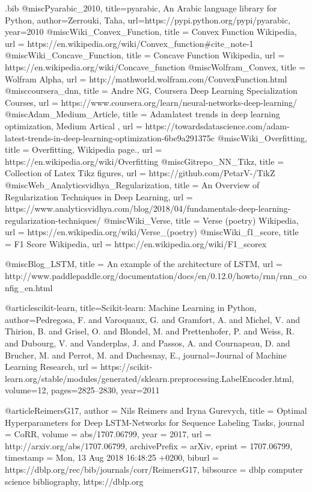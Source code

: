 \begin{filecontents}{\jobname.bib}
@misc{Pyarabic_2010,
  title={pyarabic, An Arabic language library for Python},
  author={Zerrouki, Taha},
  url={https://pypi.python.org/pypi/pyarabic},
  year={2010}
}
@misc{Wiki_Convex_Function,
  title =	 {Convex Function Wikipedia},
  url =		 {https://en.wikipedia.org/wiki/Convex\_function\#cite\_note-1}
}
@misc{Wiki_Concave_Function,
  title =	 {Concave Function Wikipedia},
  url =		 {https://en.wikipedia.org/wiki/Concave\_function}
}
@misc{Wolfram_Convex,
  title =	 {Wolfram Alpha},
  url =		 {http://mathworld.wolfram.com/ConvexFunction.html}
}
@misc{coursera_dnn,
  title =	 {Andre NG, Coursera Deep Learning Specialization Courses},
  url =		 {https://www.coursera.org/learn/neural-networks-deep-learning/}
}
@misc{Adam_Medium_Article,
  title =	 {Adam latest trends in deep learning optimization, Medium Artical },
  url =		 {https://towardsdatascience.com/adam-latest-trends-in-deep-learning-optimization-6be9a291375c}
}
@misc{Wiki_Overfitting,
  title =	 {Overfitting, Wikipedia page.},
  url =		 {https://en.wikipedia.org/wiki/Overfitting}
}
@misc{Gitrepo_NN_Tikz,
  title =	 {Collection of Latex Tikz figures},
  url =		 {https://github.com/PetarV-/TikZ}
}
@misc{Web_Analyticsvidhya_Regularization,
  title =	 {An Overview of Regularization Techniques in Deep Learning},
  url =		 {https://www.analyticsvidhya.com/blog/2018/04/fundamentals-deep-learning-regularization-techniques/}
}
@misc{Wiki_Verse,
  title =	 {Verse (poetry) Wikipedia},
  url =		 {https://en.wikipedia.org/wiki/Verse\_(poetry)}
}
@misc{Wiki_f1_score,
  title =	 {F1 Score Wikipedia},
  url =		 {https://en.wikipedia.org/wiki/F1\_scorex}
}

@misc{Blog_LSTM,
  title =	 {An example of the architecture of LSTM},
  url =		 {http://www.paddlepaddle.org/documentation/docs/en/0.12.0/howto/rnn/rnn_config_en.html}
}

@article{scikit-learn,
 title={Scikit-learn: Machine Learning in Python},
 author={Pedregosa, F. and Varoquaux, G. and Gramfort, A. and Michel, V.
         and Thirion, B. and Grisel, O. and Blondel, M. and Prettenhofer, P.
         and Weiss, R. and Dubourg, V. and Vanderplas, J. and Passos, A. and
         Cournapeau, D. and Brucher, M. and Perrot, M. and Duchesnay, E.},
 journal={Journal of Machine Learning Research},
 url = {https://scikit-learn.org/stable/modules/generated/sklearn.preprocessing.LabelEncoder.html},
 volume={12},
 pages={2825--2830},
 year={2011}
}

@article{ReimersG17,
  author    = {Nils Reimers and
               Iryna Gurevych},
  title     = {Optimal Hyperparameters for Deep LSTM-Networks for Sequence Labeling
               Tasks},
  journal   = {CoRR},
  volume    = {abs/1707.06799},
  year      = {2017},
  url       = {http://arxiv.org/abs/1707.06799},
  archivePrefix = {arXiv},
  eprint    = {1707.06799},
  timestamp = {Mon, 13 Aug 2018 16:48:25 +0200},
  biburl    = {https://dblp.org/rec/bib/journals/corr/ReimersG17},
  bibsource = {dblp computer science bibliography, https://dblp.org}
}


\end{filecontents}


